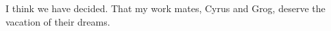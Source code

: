 

I think we have decided.  That my work mates, Cyrus and Grog, deserve
the vacation of their dreams.  

\bye
